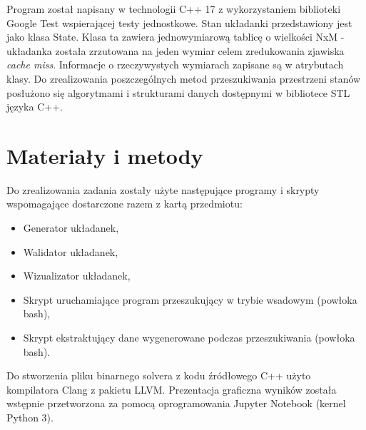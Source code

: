 \documentclass{classrep}
\begin{document}
Program został napisany w technologii C++ 17 z wykorzystaniem biblioteki
Google Test wspierającej testy jednostkowe. Stan układanki przedstawiony
jest jako klasa State. Klasa ta zawiera jednowymiarową tablicę o
wielkości NxM - układanka została zrzutowana na jeden wymiar celem
zredukowania zjawiska \emph{cache miss}. Informacje o rzeczywystych
wymiarach zapisane są w atrybutach klasy. Do zrealizowania
poszczególnych metod przeszukiwania przestrzeni stanów posłużono się
algorytmami i strukturami danych dostępnymi w bibliotece STL języka C++.

\section{Materiały i metody}
Do zrealizowania zadania zostały użyte następujące programy i skrypty wspomagające dostarczone razem z kartą
przedmiotu:
 \begin{itemize}
   \item
   Generator układanek,
   \item
   Walidator układanek,
   \item
   Wizualizator układanek,
   \item
   Skrypt uruchamiające program przeszukujący w trybie wsadowym (powłoka bash),
   \item
   Skrypt ekstraktujący dane wygenerowane podczas przeszukiwania (powłoka bash).
\end{itemize}
Do stworzenia pliku binarnego solvera z kodu źródłowego C++ użyto kompilatora Clang z pakietu LLVM.
Prezentacja graficzna wyników została wstępnie przetworzona za pomocą oprogramowania Jupyter Notebook (kernel
Python 3).
\end{document}

